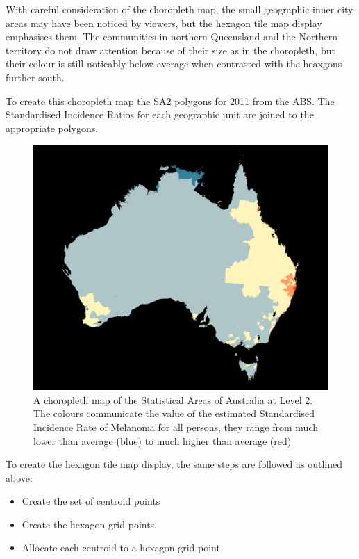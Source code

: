 \documentclass[
]{jss}
\providecommand{\tightlist}{%
  \setlength{\itemsep}{0pt}\setlength{\parskip}{0pt}}
\begin{document}
With careful consideration of the choropleth map, the small geographic
inner city areas may have been noticed by viewers, but the hexagon tile
map display emphasises them. The communities in northern Queensland and
the Northern territory do not draw attention because of their size as in
the choropleth, but their colour is still noticably below average when
contrasted with the heaxgons further south.

To create this choropleth map the SA2 polygons for 2011 from the ABS.
The Standardised Incidence Ratios for each geographic unit are joined to
the appropriate polygons.

\begin{figure}

{\centering \includegraphics[width=0.6\linewidth]{figures/aus_melanoma_p} 

}

\caption[A choropleth map of the Statistical Areas of Australia at Level 2]{A choropleth map of the Statistical Areas of Australia at Level 2. The colours communicate the value of the estimated Standardised Incidence Rate of Melanoma for all persons, they range from much lower than average (blue) to much higher than average (red)}\label{fig:melanoma-geo}
\end{figure}

To create the hexagon tile map display, the same steps are followed as
outlined above:

\begin{itemize}
\tightlist
\item
  Create the set of centroid points
\item
  Create the hexagon grid points
\item
  Allocate each centroid to a hexagon grid point
\end{itemize}
\end{document}
